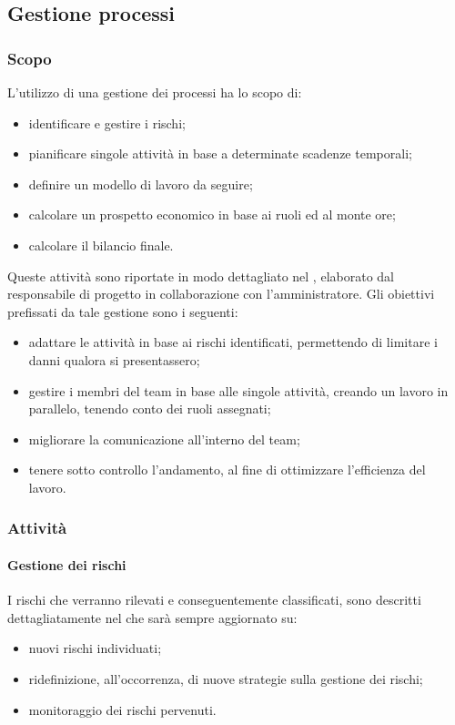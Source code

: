 \subsection{Gestione processi}

	\subsubsection{Scopo}
	L'utilizzo di una gestione dei processi ha lo scopo di:
	\begin{itemize}
		\item identificare e gestire i rischi;
		\item pianificare singole attività in base a determinate scadenze temporali;
		\item definire un modello di lavoro da seguire;
		\item calcolare un prospetto economico in base ai ruoli ed al monte ore;
		\item calcolare il bilancio finale.
	\end{itemize}
	Queste attività sono riportate in modo dettagliato nel , elaborato dal responsabile di progetto in collaborazione con l'amministratore.
	Gli obiettivi prefissati da tale gestione sono i seguenti:
	\begin{itemize}
		\item adattare le attività in base ai rischi identificati, permettendo di limitare i danni qualora si presentassero;
		\item gestire i membri del team in base alle singole attività, creando un lavoro in parallelo, tenendo conto dei ruoli assegnati;
		\item migliorare la comunicazione all'interno del team;
		\item tenere sotto controllo l'andamento, al fine di ottimizzare l'efficienza del lavoro.
	\end{itemize}

	\subsubsection{Attività}
		\paragraph{Gestione dei rischi}
		I rischi che verranno rilevati e conseguentemente classificati, sono descritti dettagliatamente nel  che sarà sempre aggiornato su:
		\begin{itemize}
			\item nuovi rischi individuati;
			\item ridefinizione, all'occorrenza, di nuove strategie sulla gestione dei rischi;
			\item monitoraggio dei rischi pervenuti.
		\end{itemize}

